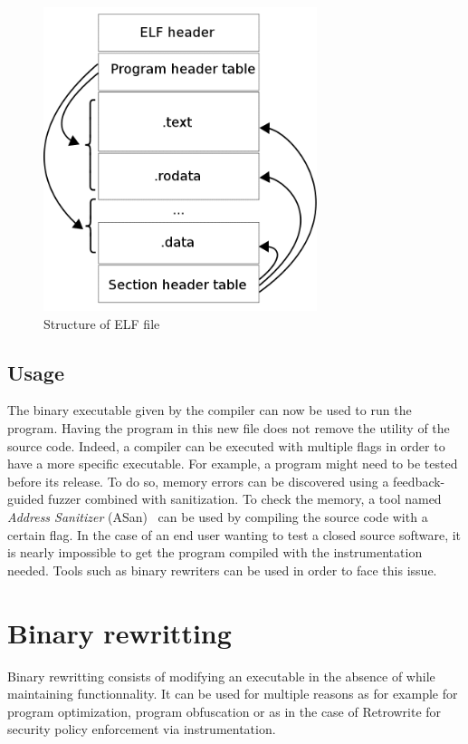 \documentclass[a4paper,11pt,oneside]{report}
\newcommand{\sysname}{Retrowrite\xspace}
\begin{document}
\begin{figure}[h]
    \centering
    \includegraphics[width=8cm]{elf_structure.png} 
    \caption{Structure of ELF file}
    \label{fig:elf}
\end{figure}



\subsection{Usage}
The binary executable given by the compiler can now be used to run the program.
Having the program in this new file does not remove the utility of the source code.
Indeed, a compiler can be executed with multiple flags in order to have a more 
specific executable. For example, a program might need to be tested before its release.
To do so, memory errors can be discovered using a feedback-guided fuzzer
combined with sanitization.
To check the memory, a tool named \textit{Address Sanitizer} (ASan)~\cite{ASan}
can be used by compiling the source code with a certain flag.
In the case of an end user wanting to test a closed source software, it is
nearly impossible to get the program compiled with the instrumentation needed.
Tools such as binary rewriters can be used in order to face this issue.


\section{Binary rewritting}
Binary rewritting consists of modifying an executable in the absence of while
maintaining functionnality. It can be used for multiple reasons as for example
for program optimization, program obfuscation or as in the case of \sysname for
security policy enforcement via instrumentation. 
\end{document}
